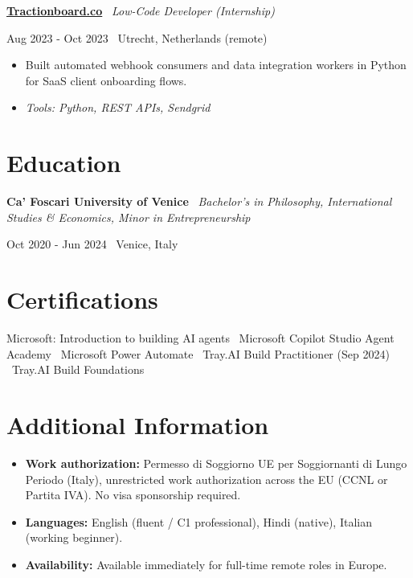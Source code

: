 \documentclass[a4paper,10pt]{article}
\newcommand{\role}[4]{%
  \vspace{2pt}\noindent
  \begin{minipage}[t]{0.70\textwidth}\raggedright\textbf{#1} \textbullet\ \textit{#3}\end{minipage}%
  \hfill
  \begin{minipage}[t]{0.28\textwidth}\raggedleft\footnotesize\color{gray}#2 \textbullet\ #4\end{minipage}%
  \vspace{1pt}%
}
\begin{document}
\role{\href{https://tractionboard.co}{Tractionboard.co}}{Aug 2023 - Oct 2023}{Low-Code Developer (Internship)}{Utrecht, Netherlands (remote)}
\begin{itemize}
  \item Built automated webhook consumers and data integration workers in Python for SaaS client onboarding flows.
  \item \textit{Tools: Python, REST APIs, Sendgrid}
\end{itemize}

\section{Education}
\role{Ca' Foscari University of Venice}{Oct 2020 - Jun 2024}{Bachelor's in Philosophy, International Studies \& Economics, Minor in Entrepreneurship}{Venice, Italy}

\section{Certifications}
Microsoft: Introduction to building AI agents \textbullet\ Microsoft Copilot Studio Agent Academy \textbullet\ Microsoft Power Automate \textbullet\ Tray.AI Build Practitioner (Sep 2024) \textbullet\ Tray.AI Build Foundations

\section{Additional Information}
\begin{itemize}
  \item \textbf{Work authorization:} Permesso di Soggiorno UE per Soggiornanti di Lungo Periodo (Italy), unrestricted work authorization across the EU (CCNL or Partita IVA). No visa sponsorship required.
  \item \textbf{Languages:} English (fluent / C1 professional), Hindi (native), Italian (working beginner).
  \item \textbf{Availability:} Available immediately for full-time remote roles in Europe.
\end{itemize}

\end{document}
